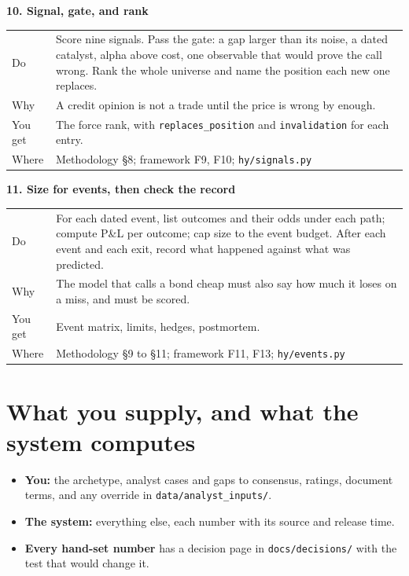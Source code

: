 \documentclass[11pt,a4paper]{article}
\makeatletter
\newcommand{\code}[1]{\texttt{\small #1}}
\newcommand{\step}[5]{%
\par\medskip\noindent\textbf{#1}\par
\noindent\begin{tabularx}{\linewidth}{@{}lX@{}}
Do & #2\\
Why & #3\\
You get & #4\\
Where & #5\\
\end{tabularx}}
\makeatother
\begin{document}
\step{10. Signal, gate, and rank}
{Score nine signals. Pass the gate: a gap larger than its noise, a dated catalyst, alpha above cost, one observable that would prove the call wrong. Rank the whole universe and name the position each new one replaces.}
{A credit opinion is not a trade until the price is wrong by enough.}
{The force rank, with \code{replaces\_position} and \code{invalidation} for each entry.}
{Methodology \S8; framework F9, F10; \code{hy/signals.py}}

\step{11. Size for events, then check the record}
{For each dated event, list outcomes and their odds under each path; compute P\&L per outcome; cap size to the event budget. After each event and each exit, record what happened against what was predicted.}
{The model that calls a bond cheap must also say how much it loses on a miss, and must be scored.}
{Event matrix, limits, hedges, postmortem.}
{Methodology \S9 to \S11; framework F11, F13; \code{hy/events.py}}

\section*{What you supply, and what the system computes}
\begin{itemize}
\item \textbf{You:} the archetype, analyst cases and gaps to consensus, ratings, document terms, and any override in \code{data/analyst\_inputs/}.
\item \textbf{The system:} everything else, each number with its source and release time.
\item \textbf{Every hand-set number} has a decision page in \code{docs/decisions/} with the test that would change it.
\end{itemize}
\end{document}
